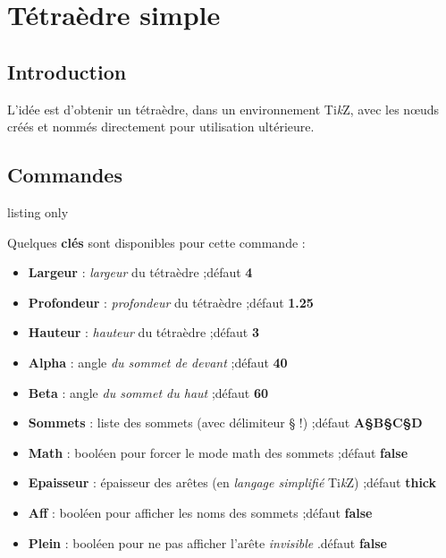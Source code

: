 \documentclass[a4paper,french,11pt]{article}
\providecommand\tikzlogo{Ti\textit{k}Z}
\let\TikZ\tikzlogo
\newcommand\Cle[1]{{\bfseries\sffamily\textlangle \textcolor{orange!75!black}{#1}\textrangle}}
\begin{document}
\newpage

\section{Tétraèdre \og simple \fg}\label{tetra}

\subsection{Introduction}

\begin{tipblock}
L'idée est d'obtenir un tétraèdre, dans un environnement \TikZ, avec les nœuds créés et nommés directement pour utilisation ultérieure.
\end{tipblock}

\subsection{Commandes}

\begin{PresCodeTexPL}{listing only}
\end{PresCodeTexPL}

\begin{cautionblock}
Quelques \Cle{clés} sont disponibles pour cette commande :

\begin{itemize}
	\item \Cle{Largeur} : \textit{largeur} du tétraèdre ;\hfill{}défaut \Cle{4}
	\item \Cle{Profondeur} : \textit{profondeur} du tétraèdre ;\hfill{}défaut \Cle{1.25}
	\item \Cle{Hauteur} : \textit{hauteur} du tétraèdre ;\hfill{}défaut \Cle{3}
	\item \Cle{Alpha} : angle \textit{du sommet de devant} ;\hfill{}défaut \Cle{40}
	\item \Cle{Beta} : angle \textit{du sommet du haut} ;\hfill{}défaut \Cle{60}
	\item \Cle{Sommets} : liste des sommets (avec délimiteur § !) ;\hfill{}défaut \Cle{A§B§C§D}
	\item \Cle{Math} : booléen pour forcer le mode math des sommets ;\hfill{}défaut \Cle{false}
	\item \Cle{Epaisseur} : épaisseur des arêtes (en \textit{langage simplifié} \TikZ) ;\hfill{}défaut \Cle{thick}
	\item \Cle{Aff} : booléen pour afficher les noms des sommets ;\hfill{}défaut \Cle{false}
	\item \Cle{Plein} : booléen pour ne pas afficher l'arête \textit{invisible} .\hfill{}défaut \Cle{false}
\end{itemize}
\vspace*{-\baselineskip}\leavevmode
\end{cautionblock}
\end{document}
